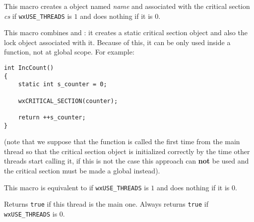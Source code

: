 \label{wxcritsectlocker}


This macro creates a  
object named {\it name} and associated with the critical section {\it cs} if 
{\tt wxUSE\_THREADS} is $1$ and does nothing if it is $0$.



\label{wxcriticalsectionmacro}


This macro combines  and 
: it creates a static critical
section object and also the lock object associated with it. Because of this, it
can be only used inside a function, not at global scope. For example:

\begin{verbatim}
int IncCount()
{
    static int s_counter = 0;

    wxCRITICAL_SECTION(counter);

    return ++s_counter;
}
\end{verbatim}

(note that we suppose that the function is called the first time from the main
thread so that the critical section object is initialized correctly by the time
other threads start calling it, if this is not the case this approach can 
{\bf not} be used and the critical section must be made a global instead).



\label{wxentercritsect}


This macro is equivalent to  if 
{\tt wxUSE\_THREADS} is $1$ and does nothing if it is $0$.



\label{wxismainthread}


Returns {\tt true} if this thread is the main one. Always returns {\tt true} if
{\tt wxUSE\_THREADS} is $0$.



\label{wxleavecritsect}

